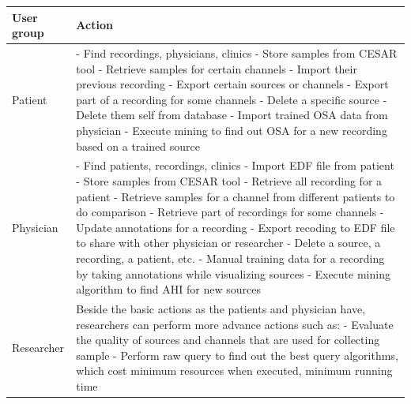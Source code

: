 \begin{table}[!htbp]
\begin{center}
\begin{tabular}{ |p{3cm}||p{10cm}|}
 \hline
 User group& Action\\
 \hline
 Patient&- Find recordings, physicians, clinics\newline
 - Store samples from CESAR tool\newline
 - Retrieve samples for certain channels\newline
 - Import their previous recording\newline
 - Export certain sources or channels\newline
 - Export part of a recording for some channels\newline
 - Delete a specific source\newline
 - Delete them self from database\newline
 - Import trained OSA data from physician\newline
 - Execute mining to find out OSA for a new recording based on a trained source\\
 \hline
 Physician&- Find patients, recordings, clinics\newline
 - Import EDF file from patient\newline
 - Store samples from CESAR tool\newline
 - Retrieve all recording for a patient\newline
 - Retrieve samples for a channel from different patients to do comparison\newline
 - Retrieve part of recordings for some channels\newline
 - Update annotations for a recording\newline
 - Export recoding to EDF file to share with other physician or researcher\newline
 - Delete a source, a recording, a patient, etc.\newline
 - Manual training data for a recording by taking annotations while visualizing sources\newline
 - Execute mining algorithm to find AHI for new sources\\
 \hline
 Researcher&Beside the basic actions as the patients and physician have, researchers can perform more advance actions such as:\newline
 - Evaluate the quality of sources and channels that are used for collecting sample\newline
 - Perform raw query to find out the best query algorithms, which cost minimum resources when executed, minimum running time\newline

\end{tabular}
\end{center}
\end{table}
